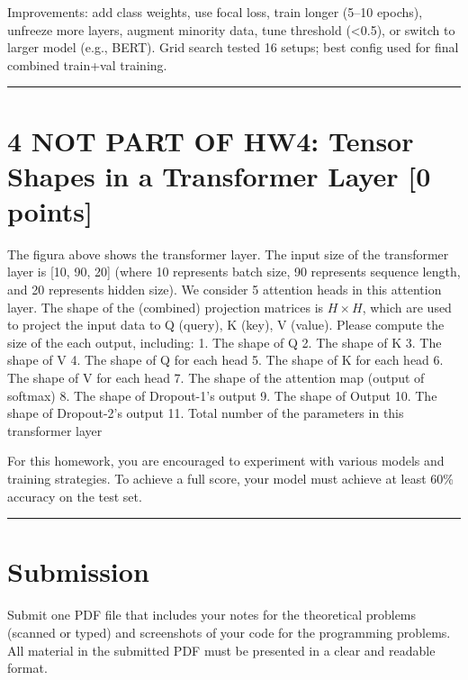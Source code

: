 \documentclass[
  letterpaper,
  DIV=11,
  numbers=noendperiod]{scrartcl}
\begin{document}
Improvements: add class weights, use focal loss, train longer (5--10
epochs), unfreeze more layers, augment minority data, tune threshold
(\textless0.5), or switch to larger model (e.g., BERT). Grid search
tested 16 setups; best config used for final combined train+val
training.

\begin{center}\rule{0.5\linewidth}{0.5pt}\end{center}

\section{4 NOT PART OF HW4: Tensor Shapes in a Transformer Layer {[}0
points{]}}\label{not-part-of-hw4-tensor-shapes-in-a-transformer-layer-0-points}

The figura above shows the transformer layer. The input size of the
transformer layer is {[}10, 90, 20{]} (where 10 represents batch size,
90 represents sequence length, and 20 represents hidden size). We
consider 5 attention heads in this attention layer. The shape of the
(combined) projection matrices is \(H\times H\), which are used to
project the input data to Q (query), K (key), V (value). Please compute
the size of the each output, including: 1. The shape of Q 2. The shape
of K 3. The shape of V 4. The shape of Q for each head 5. The shape of K
for each head 6. The shape of V for each head 7. The shape of the
attention map (output of softmax) 8. The shape of Dropout-1's output 9.
The shape of Output 10. The shape of Dropout-2's output 11. Total number
of the parameters in this transformer layer

For this homework, you are encouraged to experiment with various models
and training strategies. To achieve a full score, your model must
achieve at least 60\% accuracy on the test set.

\begin{center}\rule{0.5\linewidth}{0.5pt}\end{center}

\section{Submission}\label{submission}

Submit one PDF file that includes your notes for the theoretical
problems (scanned or typed) and screenshots of your code for the
programming problems. All material in the submitted PDF must be
presented in a clear and readable format.
\end{document}
